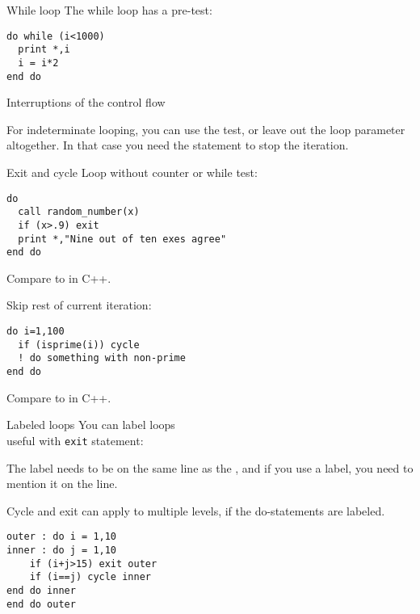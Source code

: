 \begin{block}{While loop}
  \label{sl:whilef}
  The while loop has a pre-test:
\begin{lstlisting}
do while (i<1000)
  print *,i
  i = i*2
end do
\end{lstlisting}
\end{block}


 {Interruptions of the control flow}

For indeterminate looping, you can use the  test,
or leave out the loop parameter altogether.
In that case you need the  statement to stop the iteration.

\begin{block}{Exit and cycle}
  \label{sl:loopexit}
  Loop without counter or while test:
\begin{lstlisting}
do
  call random_number(x)
  if (x>.9) exit
  print *,"Nine out of ten exes agree"
end do
\end{lstlisting}
 Compare to  in C++.

Skip rest of current iteration:
\begin{lstlisting}
do i=1,100
  if (isprime(i)) cycle
  ! do something with non-prime
end do
\end{lstlisting}
Compare to  in C++.
\end{block}

\begin{block}{Labeled loops}
  \label{sl:looplabel}
  You can label loops\\
  useful with \lstinline{exit} statement:
\end{block}

The label needs to be on the same line as the , and if you use a
label, you need to mention it on the  line.

Cycle and exit can apply to multiple levels, if the do-statements are
labeled.

\begin{lstlisting}
outer : do i = 1,10
inner : do j = 1,10
    if (i+j>15) exit outer
    if (i==j) cycle inner
end do inner
end do outer
\end{lstlisting}

